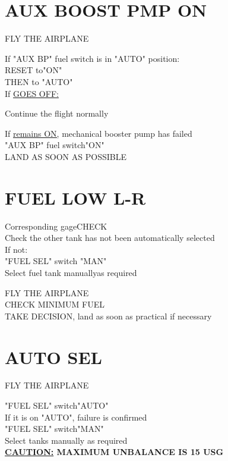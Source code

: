 \documentclass{article}
\newcommand{\fly}{\vspace{-1em}\begin{center}\color{Green}FLY THE AIRPLANE\end{center}\vspace{-1em}}
\newcommand{\warning}[1]{\colorbox{Black}{\color{Orange}{#1}}}
\begin{document}
\begin{multicols*}{2}
\section*{\color{Orange}AUX BOOST PMP ON}
\vspace*{1em}\fly
If "AUX BP" fuel switch is in "AUTO" position:\\
\hspace*{6mm} RESET to\dotfill "ON"\\
\hspace*{6mm} THEN to "AUTO"\\
If \warning{AUX BOOST PUMP ON} \underline{GOES OFF:}
\vspace{-1em}
\begin{center}
    \color{Green}Continue the flight normally
\end{center}
\vspace{-.5em}
If \warning{AUX BOOST PUMP ON} \underline{remains ON,} mechanical booster pump has failed\\
\hspace*{6mm} "AUX BP" fuel switch\dotfill "ON"\\
\hspace*{6mm} LAND AS SOON AS POSSIBLE
\vfill\null
\section*{\color{Orange}FUEL LOW L-R}
Corresponding gage\dotfill CHECK\\
Check the other tank has not been automatically selected\\
If not:\\
\hspace*{6mm}  "FUEL SEL" switch \dotfill "MAN"\\
\hspace*{6mm} Select fuel tank manually\dotfill as required
\begin{center}
    \color{Green}FLY THE AIRPLANE\\CHECK MINIMUM FUEL\\
    \color{Black}TAKE DECISION, land as soon as practical if necessary
\end{center}
\vspace{-1em}
\section*{\color{Orange}AUTO SEL}
\vspace{1em}\fly
"FUEL SEL" switch\dotfill "AUTO"\\
If it is on "AUTO", failure is confirmed\\
"FUEL SEL" switch\dotfill "MAN"\\
Select tanks manually as required\\
\textbf{\underline{CAUTION:} MAXIMUM UNBALANCE IS 15 USG}

\end{multicols*}
\end{document}
